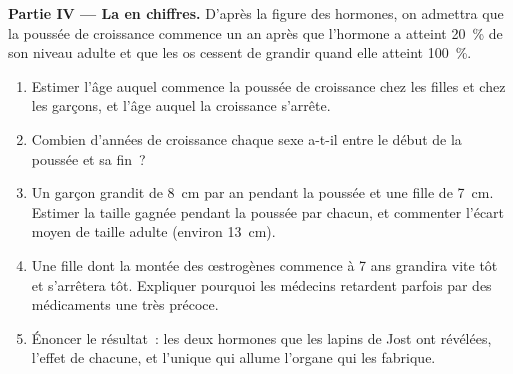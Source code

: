 \begin{problem}
\medskip
\noindent\textbf{Partie IV --- La  en chiffres.}
D'après la figure des hormones, on admettra que la poussée de
croissance commence un an après que l'hormone a atteint 20~\% de son
niveau adulte et que les os cessent de grandir quand elle atteint
100~\%.
\begin{enumerate}[resume]
  \item Estimer l'âge auquel commence la poussée de croissance chez les
        filles et chez les garçons, et l'âge auquel la croissance
        s'arrête.
  \item Combien d'années de croissance chaque sexe a-t-il entre le
        début de la poussée et sa fin~?
  \item Un garçon grandit de \qty{8}{cm} par an pendant la poussée et
        une fille de \qty{7}{cm}. Estimer la taille gagnée pendant la
        poussée par chacun, et commenter l'écart moyen de taille
        adulte (environ \qty{13}{cm}).
  \item Une fille dont la montée des œstrogènes commence à 7 ans
        grandira vite tôt et s'arrêtera tôt. Expliquer pourquoi les
        médecins retardent parfois par des médicaments une  très
        précoce.
  \item Énoncer le résultat~: les deux hormones que les lapins de Jost
        ont révélées, l'effet de chacune, et l'unique  qui allume
        l'organe qui les fabrique.
\end{enumerate}
\end{problem}
